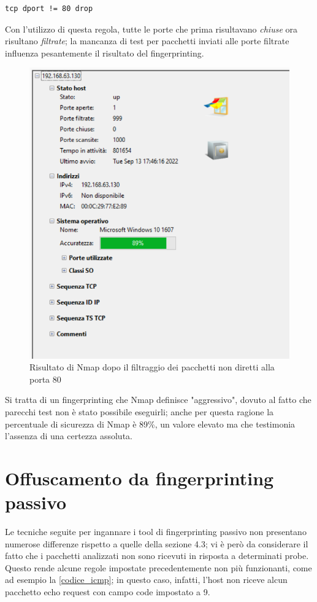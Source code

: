 \begin{lstlisting}[caption={Regola per il blocco di tutti i pacchetti ricevuti non diretti alla porta 80}]
	tcp dport != 80 drop
\end{lstlisting}

Con l'utilizzo di questa regola, tutte le porte che prima risultavano \textit{chiuse} ora risultano \textit{filtrate}; la mancanza di test per pacchetti inviati alle porte filtrate influenza pesantemente il risultato del fingerprinting.

\begin{figure}[H]
	\centering
	\includegraphics[scale=0.85]{figures/windows_nmap.png}
	\caption{Risultato di Nmap dopo il filtraggio dei pacchetti non diretti alla porta 80}
	\label{windows_nmap}
\end{figure}

Si tratta di un fingerprinting che Nmap definisce "aggressivo", dovuto al fatto che parecchi test non è stato possibile eseguirli; anche per questa ragione la percentuale di sicurezza di Nmap è 89\%, un valore elevato ma che testimonia l'assenza di una certezza assoluta.

\section{Offuscamento da fingerprinting passivo}
Le tecniche seguite per ingannare i tool di fingerprinting passivo non presentano numerose differenze rispetto a quelle della sezione 4.3; vi è però da considerare il fatto che i pacchetti analizzati non sono ricevuti in risposta a determinati probe.
Questo rende alcune regole impostate precedentemente non più funzionanti, come ad esempio la \ref{codice_icmp}; in questo caso, infatti, l'host non riceve alcun pacchetto echo request con campo code impostato a 9.

